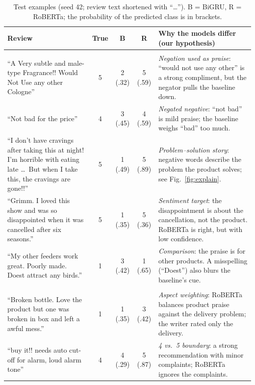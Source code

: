 \documentclass[11pt,a4paper]{article}
\renewcommand{\arraystretch}{1.12}
\begin{document}
\begin{table}[htbp]
\centering\footnotesize
\caption{Test examples (seed 42; review text shortened with ``\dots''). B = BiGRU, R = RoBERTa; the probability of the predicted class is in brackets.}
\label{tab:examples}
\renewcommand{\arraystretch}{1.2}
\begin{tabularx}{\textwidth}{>{\raggedright\arraybackslash}p{6.0cm}cccX}
\toprule
\textbf{Review} & \textbf{True} & \textbf{B} & \textbf{R} & \textbf{Why the models differ (our hypothesis)} \\
\midrule
\multicolumn{5}{l}{\textit{Baseline wrong, RoBERTa right}}\\
``A Very subtle and male-type Fragrance!! Would Not Use any other Cologne'' & 5 & 2 (.32) & 5 (.59) & \textit{Negation used as praise}: ``would not use any other'' is a strong compliment, but the negator pulls the baseline down. \\
``Not bad for the price'' & 4 & 3 (.45) & 4 (.59) & \textit{Negated negative}: ``not bad'' is mild praise; the baseline weighs ``bad'' too much. \\
``I don't have cravings after taking this at night! I'm horrible with eating late \dots\ But when I take this, the cravings are gone!!'' & 5 & 1 (.49) & 5 (.89) & \textit{Problem--solution story}: negative words describe the problem the product solves; see Fig.~\ref{fig:explain}. \\
``Grimm. I loved this show and was so disappointed when it was cancelled after six seasons.'' & 5 & 1 (.35) & 5 (.36) & \textit{Sentiment target}: the disappointment is about the cancellation, not the product. RoBERTa is right, but with low confidence. \\
``My other feeders work great. Poorly made. Doest attract any birds.'' & 1 & 3 (.42) & 1 (.65) & \textit{Comparison}: the praise is for other products. A misspelling (``Doest'') also blurs the baseline's cue. \\
\midrule
\multicolumn{5}{l}{\textit{RoBERTa wrong, baseline right}}\\
``Broken bottle. Love the product but one was broken in box and left a awful mess.'' & 1 & 1 (.35) & 3 (.42) & \textit{Aspect weighting}: RoBERTa balances product praise against the delivery problem; the writer rated only the delivery. \\
``buy it!! needs auto cut-off for alarm, loud alarm tone'' & 4 & 4 (.29) & 5 (.87) & \textit{4 vs.\ 5 boundary}: a strong recommendation with minor complaints; RoBERTa ignores the complaints. \\
\bottomrule
\end{tabularx}
\end{table}
\end{document}
